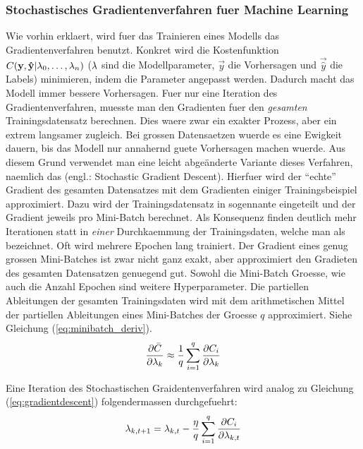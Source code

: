 \documentclass[../main]{subfiles}
\begin{document}
\subsubsection{Stochastisches Gradientenverfahren fuer Machine Learning}
Wie vorhin erklaert, wird fuer das Trainieren eines Modells das Gradientenverfahren benutzt.
Konkret wird die Kostenfunktion $C(\mathbf{y},\mathbf{\hat{y}}|\lambda_0,\ldots,\lambda_n)$
($\lambda$ sind die Modellparameter, $\vec{y}$ die Vorhersagen und $\vec{\hat{y}}$
die Labels) minimieren, indem die Parameter angepasst werden. Dadurch macht das Modell immer bessere Vorhersagen.
Fuer nur eine Iteration des Gradientenverfahren, muesste man den Gradienten fuer den
\textit{gesamten} Trainingsdatensatz berechnen.
Dies waere zwar ein exakter Prozess, aber ein extrem langsamer zugleich.
Bei grossen Datensaetzen wuerde es eine Ewigkeit dauern, bis das Modell nur annahernd guete Vorhersagen machen wuerde.
\para{}
Aus diesem Grund verwendet man eine leicht abgeänderte Variante dieses Verfahren, naemlich das  (engl.: Stochastic Gradient Descent).
Hierfuer wird der ``echte'' Gradient des gesamten Datensatzes mit dem Gradienten einiger Trainingsbeispiel approximiert.
Dazu wird der Trainingsdatensatz in sogennante  eingeteilt und der Gradient jeweils pro Mini-Batch berechnet.
Als Konsequenz finden deutlich mehr Iterationen statt in \textit{einer}
Durchkaemmung der Trainingsdaten, welche man als  bezeichnet. Oft wird mehrere Epochen lang trainiert.
Der Gradient eines genug grossen Mini-Batches ist zwar nicht ganz exakt, aber approximiert den Gradieten des gesamten Datensatzen genuegend gut.
Sowohl die Mini-Batch Groesse, wie auch die Anzahl Epochen sind weitere Hyperparameter.
\para{}
Die partiellen Ableitungen der gesamten Trainingsdaten wird mit dem arithmetischen Mittel der partiellen Ableitungen eines Mini-Batches der Groesse $q$ approximiert. Siehe Gleichung (\ref{eq:minibatch_deriv}).
\begin{equation}\label{eq:minibatch_deriv}
  \frac{\partial \bar{C}}{\partial \lambda_k} \approx \frac{1}{q}\sum_{i=1}^{q} \frac{\partial C_i}{\partial \lambda_k}
\end{equation}

Eine Iteration des Stochastischen Graidentenverfahren wird analog zu Gleichung (\ref{eq:gradientdescent}) folgendermassen durchgefuehrt:
\begin{equation}\label{eq:sgd}
  \lambda_{k,t+1} = \lambda_{k,t} - \frac{\eta}{q} \sum_{i=1}^{q} \frac{\partial C_i}{\partial \lambda_{k,t}}
\end{equation}
\end{document}
